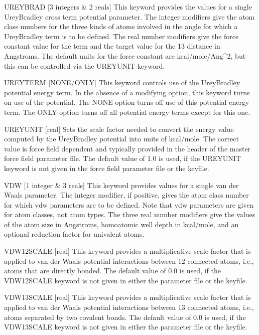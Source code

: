 \documentclass[letterpaper,11pt,english]{sphinxmanual}
\begin{document}
UREYBRAD {[}3 integers \& 2 reals{]}     This keyword provides the values for a single Urey\sphinxhyphen{}Bradley cross term potential parameter. The integer modifiers give the atom class numbers for the three kinds of atoms involved in the angle for which a Urey\sphinxhyphen{}Bradley term is to be defined. The real number modifiers give the force constant value for the term and the target value for the 1\sphinxhyphen{}3 distance in Angstroms. The default units for the force constant are kcal/mole/Ang\textasciicircum{}2, but this can be controlled via the UREYUNIT keyword.

UREYTERM {[}NONE/ONLY{]}     This keyword controls use of the Urey\sphinxhyphen{}Bradley potential energy term. In the absence of a modifying option, this keyword turns on use of the potential. The NONE option turns off use of this potential energy term. The ONLY option turns off all potential energy terms except for this one.

UREYUNIT {[}real{]}     Sets the scale factor needed to convert the energy value computed by the Urey\sphinxhyphen{}Bradley potential into units of kcal/mole. The correct value is force field dependent and typically provided in the header of the master force field parameter file. The default value of 1.0 is used, if the UREYUNIT keyword is not given in the force field parameter file or the keyfile.

VDW {[}1 integer \& 3 reals{]}     This keyword provides values for a single van der Waals parameter. The integer modifier, if positive, gives the atom class number for which vdw parameters are to be defined. Note that vdw parameters are given for atom classes, not atom types. The three real number modifiers give the values of the atom size in Angstroms, homoatomic well depth in kcal/mole, and an optional reduction factor for univalent atoms.

VDW\sphinxhyphen{}12\sphinxhyphen{}SCALE {[}real{]}     This keyword provides a multiplicative scale factor that is applied to van der Waals potential interactions between 1\sphinxhyphen{}2 connected atoms, i.e., atoms that are directly bonded. The default value of 0.0 is used, if the VDW\sphinxhyphen{}12\sphinxhyphen{}SCALE keyword is not given in either the parameter file or the keyfile.

VDW\sphinxhyphen{}13\sphinxhyphen{}SCALE {[}real{]}     This keyword provides a multiplicative scale factor that is applied to van der Waals potential interactions between 1\sphinxhyphen{}3 connected atoms, i.e., atoms separated by two covalent bonds. The default value of 0.0 is used, if the VDW\sphinxhyphen{}13\sphinxhyphen{}SCALE keyword is not given in either the parameter file or the keyfile.
\end{document}
